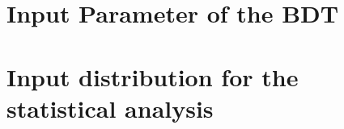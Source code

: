 \documentclass[12pt,twoside]{book}
\begin{document}
\begin{appendices}
	\pagestyle{appendix}
	\chapter{Input Parameter of the BDT}
	
	\clearpage{\pagestyle{empty}\cleardoublepage}

	\pagestyle{appendix}
	\chapter{Input distribution for the statistical analysis}
	
	\clearpage{\pagestyle{empty}\cleardoublepage}

	\pagestyle{acronyms}
	\printglossary[type=\acronymtype]
	\clearpage{\pagestyle{empty}\cleardoublepage}

	\pagestyle{bibliography}
	
	  	
	\clearpage{\pagestyle{empty}\cleardoublepage}

\end{appendices}


\end{document}
